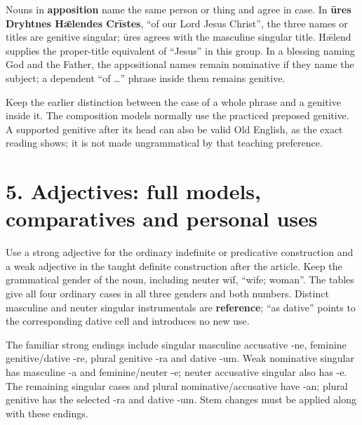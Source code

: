 Nouns in \textbf{apposition} name the same person or thing and agree in case. In \textbf{ūres Dryhtnes Hǣlendes Crīstes}, “of our Lord Jesus Christ”, the three names or titles are genitive singular; ūres agrees with the masculine singular title. Hǣlend supplies the proper-title equivalent of “Jesus” in this group. In a blessing naming God and the Father, the appositional names remain nominative if they name the subject; a dependent “of …” phrase inside them remains genitive.

Keep the earlier distinction between the case of a whole phrase and a genitive inside it. The composition models normally use the practiced preposed genitive. A supported genitive after its head can also be valid Old English, as the exact reading shows; it is not made ungrammatical by that teaching preference.

\section*{5. Adjectives: full models, comparatives and personal uses}

Use a strong adjective for the ordinary indefinite or predicative construction and a weak adjective in the taught definite construction after the article. Keep the grammatical gender of the noun, including neuter wīf, “wife; woman”. The tables give all four ordinary cases in all three genders and both numbers. Distinct masculine and neuter singular instrumentals are \textbf{reference}; “as dative” points to the corresponding dative cell and introduces no new use.

The familiar strong endings include singular masculine accusative -ne, feminine genitive/\allowbreak{}dative -re, plural genitive -ra and dative -um. Weak nominative singular has masculine -a and feminine/\allowbreak{}neuter -e; neuter accusative singular also has -e. The remaining singular cases and plural nominative/\allowbreak{}accusative have -an; plural genitive has the selected -ra and dative -um. Stem changes must be applied along with these endings.

